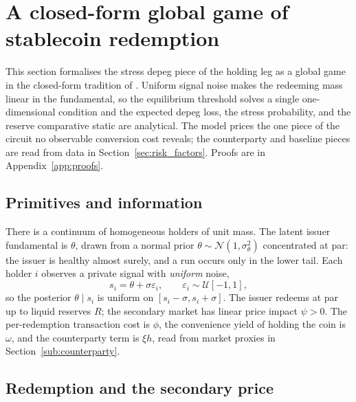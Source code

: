 \section{A closed-form global game of stablecoin redemption}\label{sec:model}

This section formalises the stress depeg piece of the holding leg as a global game in the closed-form tradition of \citet{klee_etal_2026_fragility}. Uniform signal noise makes the redeeming mass linear in the fundamental, so the equilibrium threshold solves a single one-dimensional condition and the expected depeg loss, the stress probability, and the reserve comparative static are analytical. The model prices the one piece of the circuit no observable conversion cost reveals; the counterparty and baseline pieces are read from data in Section~\ref{sec:risk_factors}. Proofs are in Appendix~\ref{app:proofs}.

\subsection{Primitives and information}\label{sub:model_primitives}

There is a continuum of homogeneous holders of unit mass. The latent issuer fundamental is $\theta$, drawn from a normal prior $\theta \sim \mathcal{N}(1, \sigma_\theta^2)$ concentrated at par: the issuer is healthy almost surely, and a run occurs only in the lower tail. Each holder $i$ observes a private signal with \emph{uniform} noise,
\begin{equation}\label{eq:signal}
s_i = \theta + \sigma \varepsilon_i, \qquad \varepsilon_i \sim \mathcal{U}[-1, 1],
\end{equation}
so the posterior $\theta \mid s_i$ is uniform on $[s_i - \sigma, s_i + \sigma]$. The issuer redeems at par up to liquid reserves $R$; the secondary market has linear price impact $\psi > 0$. The per-redemption transaction cost is $\phi$, the convenience yield of holding the coin is $\omega$, and the counterparty term is $\xi h$, read from market proxies in Section~\ref{sub:counterparty}.

\subsection{Redemption and the secondary price}\label{sub:model_secondary}

